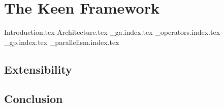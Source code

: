 
\chapter{The Keen Framework}
\label{chap:keen}
  {Introduction.tex}
  {Architecture.tex}
  {_ga.index.tex}
  {_operators.index.tex}
  {_gp.index.tex}
  {_parallelism.index.tex}  
  
  \section{Extensibility}
  \label{sec:extensibility}
    \Blindtext
  \section{Conclusion}
  \label{sec:conclusion}
    \Blindtext
